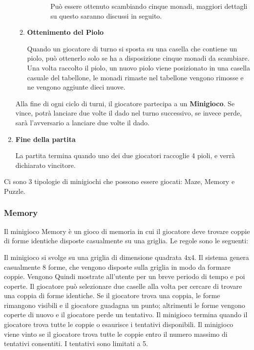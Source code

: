\begin{enumerate}
\begin{enumerate}
\begin{itemize}
\begin{itemize}
                Può essere ottenuto scambiando cinque monadi, maggiori dettagli
                su questo saranno discussi in seguito.
            \end{itemize}
        \end{itemize}
        \item \textbf{Ottenimento del Piolo}\par
        Quando un giocatore di turno si sposta su una casella che contiene un piolo, 
        può ottenerlo solo se ha a disposizione cinque monadi da scambiare. Una volta raccolto il piolo,
        un nuovo piolo viene posizionato in una casella casuale del tabellone, le monadi
        rimaste nel tabellone vengono rimosse e ne vengono aggiunte dieci nuove.
    \end{enumerate}
    Alla fine di ogni ciclo di turni, il giocatore partecipa a un \textbf{Minigioco}.
    Se vince, potrà lanciare due volte il dado nel turno successivo, 
    se invece perde, sarà l'avversario a lanciare due volte il dado.
    \item \textbf{Fine della partita}\par
    La partita termina quando uno dei due giocatori raccoglie 4 pioli,
    e verrà dichiarato vincitore.
    
\end{enumerate}

Ci sono 3 tipologie di minigiochi che possono essere giocati: Maze, Memory e Puzzle.
\subsubsection{Memory}
Il minigioco Memory è un gioco di memoria in cui il giocatore deve trovare coppie di forme identiche
disposte casualmente su una griglia. Le regole sono le seguenti:

Il minigioco si svolge su una griglia di dimensione quadrata 4x4. Il sistema genera casualmente 8 forme, che vengono disposte
sulla griglia in modo da formare coppie. Vengono Quindi mostrate all'utente per un breve periodo di tempo e poi coperte. Il
giocatore può selezionare due caselle alla volta per cercare di trovare una coppia di forme identiche. Se il giocatore trova una
coppia, le forme rimangono visibili e il giocatore guadagna un punto; altrimenti le forme vengono coperte di nuovo e il giocatore
perde un tentativo. Il minigioco termina quando il giocatore trova tutte le coppie o esaurisce i tentativi disponibili. Il minigioco
viene vinto se il giocatore trova tutte le coppie entro il numero massimo di tentativi consentiti. I tentativi sono limitati a 5.


